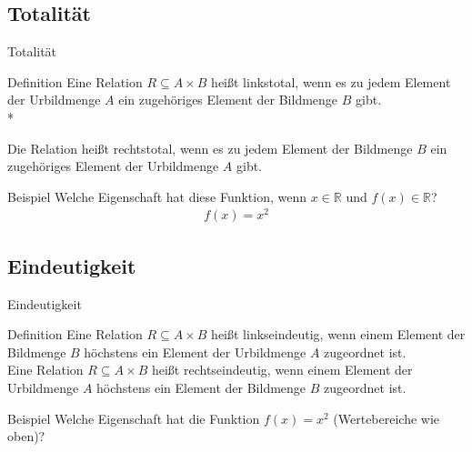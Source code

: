     \subsection{Totalität}
        \begin{frame}{Totalität}
            \begin{block}{Definition}
                Eine Relation $R \subseteq A \times B $ heißt linkstotal, wenn es zu jedem Element der Urbildmenge $A$ ein zugehöriges Element der Bildmenge $B$ gibt.\\*


                Die Relation heißt rechtstotal, wenn es zu jedem Element der Bildmenge $B$ ein zugehöriges Element der Urbildmenge $A$ gibt.
            \end{block}
            \pause
            \begin{exampleblock}{Beispiel}
                Welche Eigenschaft hat diese Funktion, wenn $x \in \mathbb{R}$ und $f(x) \in \mathbb{R}$? 
                \begin{align*}
                    f\left(x\right) = x^2
                \end{align*}
                \pause
            \end{exampleblock}
        \end{frame}

    \subsection{Eindeutigkeit}
        \begin{frame}{Eindeutigkeit}
            \begin{block}{Definition}
                Eine Relation $R \subseteq A \times B$ heißt linkseindeutig, wenn einem Element der Bildmenge $B$ höchstens ein Element der Urbildmenge $A$ zugeordnet ist.\\


                Eine Relation $R \subseteq A \times B$ heißt rechtseindeutig, wenn einem Element der Urbildmenge $A$ höchstens ein Element der Bildmenge $B$ zugeordnet ist.
            \end{block}
            \pause
            \begin{exampleblock}{Beispiel}
                Welche Eigenschaft hat die Funktion $f(x) = x^2$ (Wertebereiche wie oben)?
                \pause
            \end{exampleblock}
        \end{frame}

